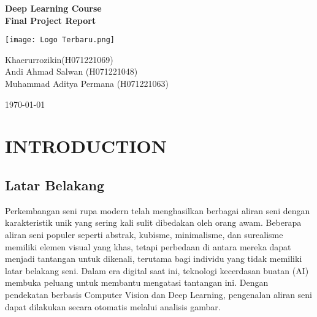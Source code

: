 \documentclass[12pt,a4paper]{article}
\begin{document}
\begin{titlepage}
    \centering
    {\Large\textbf{Deep Learning Course \\ Final Project Report}\par} %
    \vspace{2cm} %
    \texttt{[image: Logo Terbaru.png]}\par %
    \vspace{2cm} %
    {\large
    Khaerurrozikin(H071221069)\\ 
    Andi Ahmad Salwan (H071221048)\\ 
    Muhammad Aditya Permana (H071221063)\par}
    \vspace{1cm} %
    {\large\today\par} %
\end{titlepage}

\normalsize  %
\tableofcontents
\newpage

\section{INTRODUCTION}
\subsection{Latar Belakang }
\begin{adjustwidth}{3em}{0pt} 
\hspace{0.5cm} Perkembangan seni rupa modern telah menghasilkan berbagai aliran seni dengan karakteristik unik yang sering kali sulit dibedakan oleh orang awam. Beberapa aliran seni populer seperti abstrak, kubisme, minimalisme, dan surealisme memiliki elemen visual yang khas, tetapi perbedaan di antara mereka dapat menjadi tantangan untuk dikenali, terutama bagi individu yang tidak memiliki latar belakang seni. Dalam era digital saat ini, teknologi kecerdasan buatan (AI) membuka peluang untuk membantu mengatasi tantangan ini. Dengan pendekatan berbasis Computer Vision dan Deep Learning, pengenalan aliran seni dapat dilakukan secara otomatis melalui analisis gambar.
 \end{adjustwidth}
\
\end{document}
